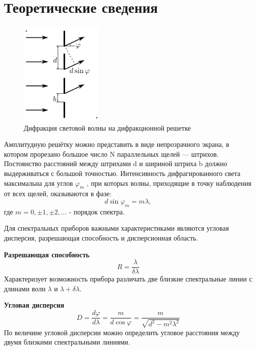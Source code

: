 \section*{Теоретические сведения}
\begin{figure}
    \centering
    \includegraphics[width=4cm]{images/difrationnaya_reshetka.png}
    \caption{Дифракция световой волны на дифракционной решетке}
\end{figure}
\indent Амплитудную решётку можно представить в виде непрозрачного экрана, в котором прорезано большое число N параллельных щелей — штрихов. Постоянство 
расстояний между штрихами d и шириной штриха b должно выдерживаться с большой точностью.
\indent Интенсивность дифрагированного света максимальна для углов $\varphi_m$ , при которых волны, приходящие в точку наблюдения от всех щелей, оказываются в
фазе:
\begin{equation}
    d\sin\varphi_m = m\lambda \label{eq:main_difraction}, 
\end{equation}
где $m = 0, \pm 1, \pm 2, \dots$ - порядок спектра.

\indent
Для спектральных приборов важными характеристиками являются
угловая дисперсия, разрешающая способность и дисперсионная область.

\textbf{Разрешающая способность}\\
\begin{equation}
    R = \frac{\lambda}{\delta \lambda} \label{eq:spectr_1}
\end{equation}
\indent Характеризует возможность прибора различать две близкие спектральные линии с длинами волн $\lambda$ и $\lambda + \delta \lambda$.

\textbf{Угловая дисперсия}\\
\begin{equation}
    D = \frac{d\varphi}{d\lambda} = \frac{m}{d\cos\varphi} = \frac{m}{\sqrt{d^2 - m^2{\lambda}^2}} \label{eq:spectr_2}
\end{equation}
\indent По величине угловой дисперсии можно определить угловое расстояния между двумя близкими спектральными линиями.

